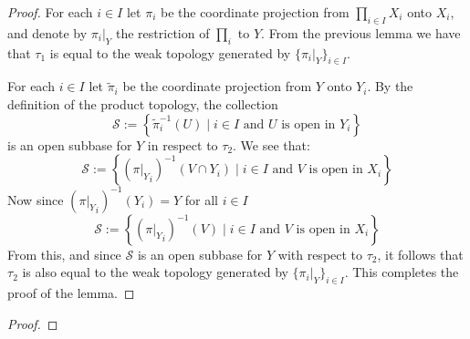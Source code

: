 \documentclass[11pt,a4paper]{article}
\theoremstyle{definition}
\theoremstyle{plain}
\newcommand{\set}[2]{ \left\{ #1 \mid #2 \right\} }
\begin{document}
	\begin{proof}
		For each $i \in I$ let $\pi_i$ be the coordinate projection from 
		$\prod_{i \in I}{X_i}$ onto $X_i$, and denote by $\pi_i\vert_Y$ the 
		restriction of $\prod_i$ to $Y$. From the previous lemma we have
		that $\tau_1$ is equal to the weak topology generated by 
		$\{\pi_i \vert_Y\}_{i \in I}$. 
		
		For each $i \in I$ let $\tilde{\pi}_i$ be the coordinate projection from 
		$Y$ onto $Y_i$. By the definition of the product topology, the collection
		\[
			\mathcal{S} := \set{\tilde{\pi}_{i}^{-1}(U)}
			{\text{$i \in I$ and $U$ is open in $Y_i$}}
		\]
		is an open subbase for $Y$ in respect to $\tau_2$. We see that:
		\[
			\mathcal{S} := \set{({\pi \vert_Y}_{i})^{-1}(V \cap Y_i)}
			{\text{$i \in I$ and $V$ is open in $X_i$}}
		\]
		Now since $({\pi \vert_Y}_{i})^{-1}(Y_i) = Y$ for all $i \in I$
		\[
			\mathcal{S} := \set{({\pi \vert_Y}_{i})^{-1}(V)}
			{\text{$i \in I$ and $V$ is open in $X_i$}}
		\]
		From this, and since $\mathcal{S}$ is an open subbase for $Y$ with 
		respect to $\tau_2$, it follows that $\tau_2$ is also equal to the weak 
		topology generated by $\{\pi_i \vert_Y\}_{i \in I}$. This completes the
		proof of the lemma.
	\end{proof}
	\begin{proof}
		
	\end{proof}
	
	\newpage
	
\end{document}
